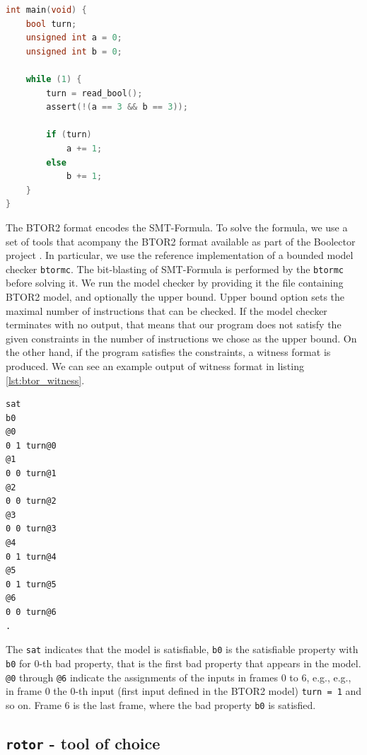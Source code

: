 \documentclass[12pt]{article}
\begin{document}
\newpage
\begin{lstlisting}[label=lst:c_code, language=c, caption={\texttt{C} code we generate a model from},captionpos=b]
int main(void) {
    bool turn;
    unsigned int a = 0;
    unsigned int b = 0;

    while (1) {
        turn = read_bool();
        assert(!(a == 3 && b == 3));

        if (turn)
            a += 1;
        else
            b += 1;
    }
}
\end{lstlisting}

The BTOR2 format encodes the SMT-Formula. To solve the formula, we use a set of
tools that acompany the BTOR2 format available as part of the Boolector project
\cite{DBLP:journals/jsat/NiemetzPB14}. In particular, we use the reference
implementation of a bounded model checker \texttt{btormc}. The bit-blasting of
SMT-Formula is performed by the \texttt{btormc} before solving it. We run the
model checker by providing it the file containing BTOR2 model, and optionally
the upper bound. Upper bound option sets the maximal number of instructions
that can be checked. If the model checker terminates with no output, that means
that our program does not satisfy the given constraints in the number of
instructions we chose as the upper bound. On the other hand, if the program
satisfies the constraints, a witness format is produced. We can see an example
output of witness format in listing \ref{lst:btor_witness}.

\begin{lstlisting}[label=lst:btor_witness, caption={BTOR2 Witness Format for model in listing \ref{lst:btor2_example}}, captionpos=b]
sat
b0
@0
0 1 turn@0
@1
0 0 turn@1
@2
0 0 turn@2
@3
0 0 turn@3
@4
0 1 turn@4
@5
0 1 turn@5
@6
0 0 turn@6
.
\end{lstlisting}

The \texttt{sat} indicates that the model is satisfiable, \texttt{b0} is the 
satisfiable property with \texttt{b0} for 0-th bad property, that is the first
bad property that appears in the model. \texttt{@0} through \texttt{@6}
indicate the assignments of the inputs in frames 0 to 6, e.g., e.g., in frame
0 the 0-th input (first input defined in the BTOR2 model) \texttt{turn = 1} and
so on. Frame 6 is the last frame, where the bad property \texttt{b0} is
satisfied.

\subsection{\texttt{rotor} - tool of choice}
\end{document}
